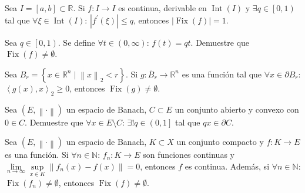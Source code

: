 \question

Sea $I=\left[a,b\right]\subset\mathbb{R}$.
Si $f\colon I\to I$ es continua, derivable en
$\operatorname{Int}\left(I\right)$ y $\exists q\in\left[0,1\right)$
tal que $\forall\xi\in\operatorname{Int}\left(I\right)$:
$\left|f^{\prime}\left(\xi\right)\right|\leq q$, entonces
$\left|\operatorname{Fix}\left(f\right)\right|=1$.

\begin{solutionordottedlines}
\end{solutionordottedlines}

\question

Sea $q\in\left[0,1\right)$.
Se define $\forall t\in\left(0,\infty\right)$: $f\left(t\right)=qt$.
Demuestre que $\operatorname{Fix}\left(f\right)\neq\emptyset$.

\begin{solutionordottedlines}
\end{solutionordottedlines}

\question

Sea
\begin{math}
  B_{r}=
  \left\{x\in\mathbb{R}^{n}\mid{\left\|x\right\|}_{2}<r\right\}
\end{math}.
Si $g\colon\overline{B}_{r}\to\mathbb{R}^{n}$ es una función tal que
$\forall x\in\partial B_{r}$:
${\left\langle g\left(x\right),x\right\rangle}_{2}\geq 0$, entonces
$\operatorname{Fix}\left(g\right)\neq\emptyset$.

\begin{solutionordottedlines}
\end{solutionordottedlines}

\question

Sea $\left(E,\left\|\cdot\right\|\right)$ un espacio de Banach,
$C\subset E$ un conjunto abierto y convexo con $0\in C$.
Demuestre que $\forall x\in E\setminus C$:
$\exists!q\in\left(0,1\right]$ tal que $qx\in\partial C$.

\begin{solutionordottedlines}
\end{solutionordottedlines}

\question

Sea $\left(E,\left\|\cdot\right\|\right)$ un espacio de Banach,
$K\subset X$ un conjunto compacto y $f\colon K\to E$ es una función.
Si $\forall n\in\mathbb{N}$: $f_{n}\colon K\to E$ son funciones
continuas y
\begin{math}
  \lim\limits_{n\to\infty}
  \sup\limits_{x\in K}
  \left\|f_{n}\left(x\right)-f\left(x\right)\right\|=
  0
\end{math},
entonces $f$ es continua.
Además, si $\forall n\in\mathbb{N}$:
$\operatorname{Fix}\left(f_{n}\right)\neq\emptyset$, entonces
$\operatorname{Fix}\left(f\right)\neq\emptyset$.

